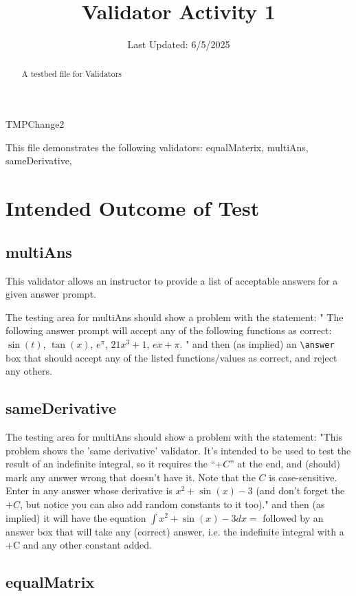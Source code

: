 \documentclass{ximera}
\title{Validator Activity 1}
\date{Last Updated: 6/5/2025}
\begin{document}
\begin{abstract}
    A testbed file for Validators
\end{abstract}
\maketitle

TMPChange2

This file demonstrates the following validators: equalMaterix, multiAns, sameDerivative, 

\section{Intended Outcome of Test}

    \subsection*{multiAns}
        This validator allows an instructor to provide a list of acceptable answers for a given answer prompt.

        The testing area for multiAns should show a problem with the statement: 
        " The following answer prompt will accept any of the following functions as correct: $\sin(t)$, $\tan(x)$, $e^\pi$, $21x^3 + 1$, $ex + \pi$. "
        and then (as implied) an \verb|\answer| box that should accept any of the listed functions/values as correct, and reject any others.

    \subsection*{sameDerivative}
        The testing area for multiAns should show a problem with the statement: 
        "This problem shows the 'same derivative' validator. It's intended to be used to test the result of an indefinite integral, so it requires the ``$+C$'' at the end, and (should) mark any answer wrong that doesn't have it. Note that the $C$ is case-sensitive. \\
            
            Enter in any answer whose derivative is $x^2 + \sin(x) - 3$ (and don't forget the $+C$, but notice you can also add random constants to it too)."
        and then (as implied) it will have the equation $\int x^2 + \sin(x) - 3 dx =$ followed by an answer box that will take any (correct) answer, i.e. the 
        indefinite integral with a +C and any other constant added.

    \subsection*{equalMatrix}
\end{document}
